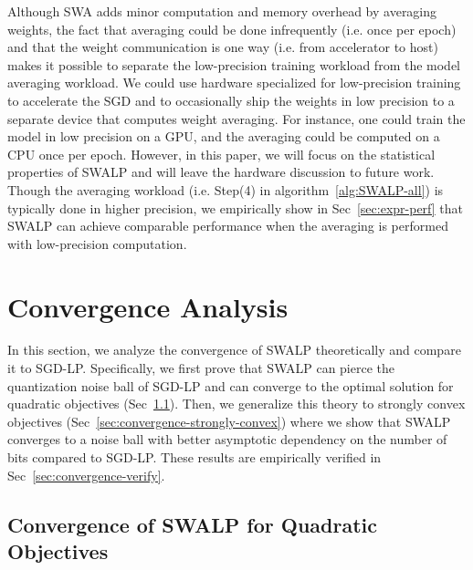 \documentclass{article}
\begin{document}
Although SWA adds minor computation and memory overhead by averaging weights, the fact that averaging could be done infrequently (i.e. once per epoch) and that the weight communication is one way (i.e. from accelerator to host) makes it possible to separate the low-precision training workload from the model averaging workload.
We could use hardware specialized for low-precision training to accelerate the SGD and to occasionally ship the weights in low precision to a separate device that computes weight averaging. 
For instance, one could train the model in low precision on a GPU, and the averaging could be computed on a CPU once per epoch. 
However, in this paper, we will focus on the statistical properties of SWALP and will leave the hardware discussion to future work.
Though the averaging workload (i.e. Step(4) in algorithm~\ref{alg:SWALP-all}) is typically done in higher precision, we empirically show in Sec~\ref{sec:expr-perf} that SWALP can achieve comparable performance when the averaging is performed with low-precision computation.


\section{Convergence Analysis}\label{sec:convergence} %

In this section, we analyze the convergence of SWALP theoretically and compare it to SGD-LP.
Specifically, we first prove that SWALP can pierce the quantization noise ball of SGD-LP and can converge to the optimal solution for quadratic objectives (Sec~\ref{sec:convergence-quadratic}).
Then, we generalize this theory to strongly convex objectives (Sec~\ref{sec:convergence-strongly-convex}) where we show that SWALP converges to a noise ball with better asymptotic dependency on the number of bits compared to SGD-LP.
These results are empirically verified in Sec~\ref{sec:convergence-verify}.

\subsection{Convergence of SWALP for Quadratic Objectives}\label{sec:convergence-quadratic}
\end{document}
